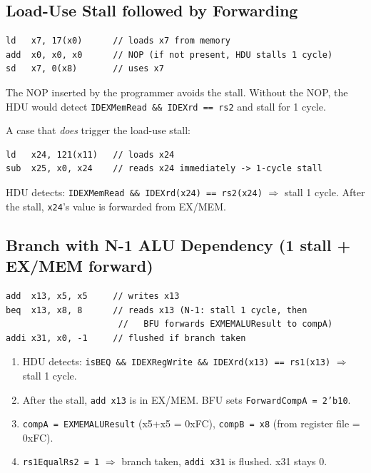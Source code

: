 \documentclass[12pt,a4paper]{article}
\begin{document}
\subsection{Load-Use Stall followed by Forwarding}
\begin{lstlisting}[style=verilog, numbers=none]
ld   x7, 17(x0)      // loads x7 from memory
add  x0, x0, x0      // NOP (if not present, HDU stalls 1 cycle)
sd   x7, 0(x8)       // uses x7
\end{lstlisting}
The NOP inserted by the programmer avoids the stall. Without the NOP, the HDU would detect \texttt{IDEXMemRead \&\& IDEXrd == rs2} and stall for 1 cycle.

A case that \emph{does} trigger the load-use stall:
\begin{lstlisting}[style=verilog, numbers=none]
ld   x24, 121(x11)   // loads x24
sub  x25, x0, x24    // reads x24 immediately -> 1-cycle stall
\end{lstlisting}
HDU detects: \texttt{IDEXMemRead \&\& IDEXrd(x24) == rs2(x24)} $\Rightarrow$ stall 1 cycle. After the stall, \texttt{x24}'s value is forwarded from EX/MEM.

\subsection{Branch with N-1 ALU Dependency (1 stall + EX/MEM forward)}
\begin{lstlisting}[style=verilog, numbers=none]
add  x13, x5, x5     // writes x13
beq  x13, x8, 8      // reads x13 (N-1: stall 1 cycle, then
                      //   BFU forwards EXMEMALUResult to compA)
addi x31, x0, -1     // flushed if branch taken
\end{lstlisting}
\begin{enumerate}
    \item HDU detects: \texttt{isBEQ \&\& IDEXRegWrite \&\& IDEXrd(x13) == rs1(x13)} $\Rightarrow$ stall 1 cycle.
    \item After the stall, \texttt{add x13} is in EX/MEM. BFU sets \texttt{ForwardCompA = 2'b10}.
    \item \texttt{compA = EXMEMALUResult} (x5+x5 = 0xFC), \texttt{compB = x8} (from register file = 0xFC).
    \item \texttt{rs1EqualRs2 = 1} $\Rightarrow$ branch taken, \texttt{addi x31} is flushed. x31 stays 0.
\end{enumerate}
\end{document}
